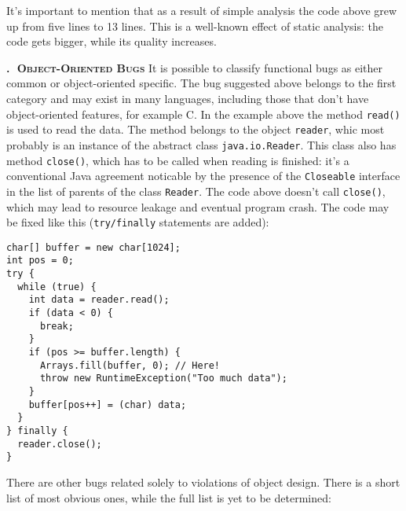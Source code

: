 \documentclass[12pt]{article}
\newcommand{\code}[1]{\texttt{#1}}
\newcounter{sector}[section]
\renewcommand\thesector{\thesection.\arabic{sector}}
\newcommand{\sector}[1]{\refstepcounter{sector}\vspace{6pt}\textbf{\textsc{\thesector $\;$ #1}}\quad}
\begin{document}
It's important to mention that as a result of simple analysis the code
above grew up from five lines to 13 lines. This is a well-known effect
of static analysis: the code gets bigger, while its quality increases.

\sector{Object-Oriented Bugs}
It is possible to classify functional bugs as either common or object-oriented specific.
The bug suggested above belongs to the first category and may exist in
many languages, including those that don't have object-oriented features,
for example C. In the example above the method \code{read()} is used to read
the data. The method belongs to the object \code{reader}, whic most probably
is an instance of the abstract class \code{java.io.Reader}. This class
also has method \code{close()}, which has to be called when reading is finished:
it's a conventional Java agreement noticable by the presence of the
\code{Closeable} interface in the list of parents of the class \code{Reader}.
The code above doesn't call \code{close()}, which may lead to resource leakage
and eventual program crash. The code may be fixed like this (\code{try/finally}
statements are added):

\begin{verbatim}
char[] buffer = new char[1024];
int pos = 0;
try {
  while (true) {
    int data = reader.read();
    if (data < 0) {
      break;
    }
    if (pos >= buffer.length) {
      Arrays.fill(buffer, 0); // Here!
      throw new RuntimeException("Too much data");
    }
    buffer[pos++] = (char) data;
  }
} finally {
  reader.close();
}
\end{verbatim}

There are other bugs related solely to violations of object design.
There is a short list of most obvious ones, while the full list is
yet to be determined:
\end{document}
